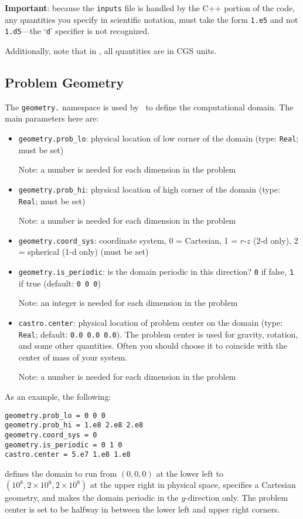 {\bf Important}: because the {\tt inputs} file is handled by the C++ portion of
the code, any quantities you specify in scientific notation, must take the
form {\tt 1.e5} and not {\tt 1.d5}---the `{\tt d}' specifier is not recognized.

Additionally, note that in \castro, all quantities are in CGS units.

\subsection{Problem Geometry}

The {\tt geometry.} namespace is used by \boxlib\ to define the
computational domain.  The main parameters here are:
\begin{itemize}
\item {\tt geometry.prob\_lo}: physical location of low corner of the
domain (type: {\tt Real}; must be set)

  Note: a number is needed for each dimension in the problem
  
\item {\tt geometry.prob\_hi}: physical location of high corner of the
domain (type: {\tt Real}; must be set)

  Note: a number is needed for each dimension in the problem
  
\item {\tt geometry.coord\_sys}: coordinate system, 0 = Cartesian,
1 = $r$-$z$ (2-d only), 2 = spherical (1-d only) (must be set)

\item {\tt geometry.is\_periodic}: is the domain periodic in this direction?
  {\tt 0} if false, {\tt 1} if true  (default: {\tt 0 0 0}) 

  Note: an integer is needed for each dimension in the problem

\item {\tt castro.center}: physical location of problem center on the domain 
(type: {\tt Real}; default: {\tt 0.0 0.0 0.0}).
The problem center is used for gravity, rotation, and some other quantities.
Often you should choose it to coincide with the center of mass of your system.

  Note: a number is needed for each dimension in the problem

\end{itemize}

As an example, the following:
\begin{lstlisting}
geometry.prob_lo = 0 0 0
geometry.prob_hi = 1.e8 2.e8 2.e8 
geometry.coord_sys = 0 
geometry.is_periodic = 0 1 0 
castro.center = 5.e7 1.e8 1.e8
\end{lstlisting}
defines the domain to run from $(0,0,0)$ at the lower left to
$(10^8,2\times 10^8,2\times 10^8)$ at the upper right in physical space, specifies a
Cartesian geometry, and makes the domain periodic in the $y$-direction
only. The problem center is set to be halfway in between the lower left and 
upper right corners.


